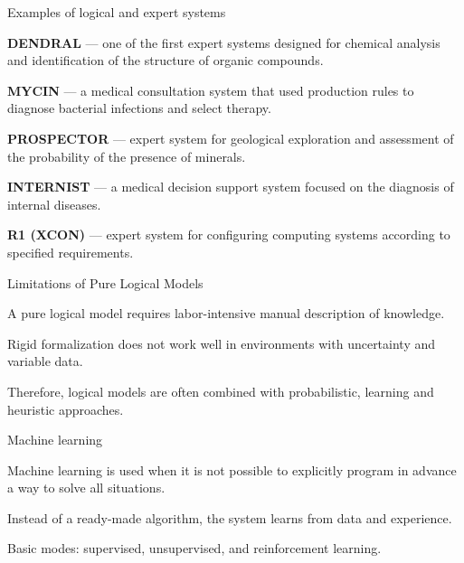 \begin{frame}{Examples of logical and expert systems}
	\topline
	\justifying
	
	\vspace{10mm}
	
	\begin{textitemize}
		\item \textbf{DENDRAL} --- one of the first expert systems designed for chemical analysis and identification of the structure of organic compounds.
		\item \textbf{MYCIN} --- a medical consultation system that used production rules to diagnose bacterial infections and select therapy.
		\item \textbf{PROSPECTOR} --- expert system for geological exploration and assessment of the probability of the presence of minerals.
		\item \textbf{INTERNIST} --- a medical decision support system focused on the diagnosis of internal diseases.
		\item \textbf{R1 (XCON)} --- expert system for configuring computing systems according to specified requirements.
	\end{textitemize}
\end{frame}

\begin{frame}{Limitations of Pure Logical Models}
	\topline
	\justifying
	
	\begin{textitemize}
		\item A pure logical model requires labor-intensive manual description of knowledge.
		\item Rigid formalization does not work well in environments with uncertainty and variable data.
		\item Therefore, logical models are often combined with probabilistic, learning and heuristic approaches.
	\end{textitemize}
\end{frame}

\begin{frame}{Machine learning}
	\topline
	\justifying
	
	\begin{textitemize}
		\item Machine learning is used when it is not possible to explicitly program in advance a way to solve all situations.
		\item Instead of a ready-made algorithm, the system learns from data and experience.
		\item Basic modes: supervised, unsupervised, and reinforcement learning.
	\end{textitemize}
\end{frame}

